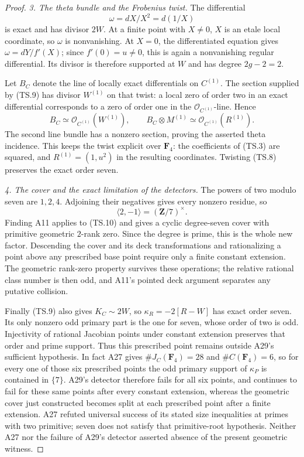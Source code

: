 \begin{proof}
\emph{3. The theta bundle and the Frobenius twist.}
The differential
\[
                    \omega=dX/X^2=d(1/X)
 \tag{TS.9}
\]
is exact and has divisor $2W$.  At a finite point with $X\ne0$,
$X$ is an etale local coordinate, so $\omega$ is nonvanishing.
At $X=0$, the differentiated equation gives
$\omega=dY/f'(X)$; since $f'(0)=u\ne0$, this is again a
nonvanishing regular differential.  Its divisor is therefore
supported at $W$ and has degree $2g-2=2$.

Let $B_C$ denote the line of locally exact differentials on
$C^{(1)}$.  The section supplied by (TS.9) has divisor
$W^{(1)}$ on that twist: a local zero of order two in an exact
differential corresponds to a zero of order one in the
$\mathcal O_{C^{(1)}}$-line.  Hence
\[
 B_C\simeq\mathcal O_{C^{(1)}}(W^{(1)}),\qquad
 B_C\otimes M^{(1)}
       \simeq\mathcal O_{C^{(1)}}(R^{(1)}).
 \tag{TS.10}
\]
The second line bundle has a nonzero section, proving the asserted
theta incidence.  This keeps the twist explicit over $\mathbf F_4$:
the coefficients of (TS.3) are squared, and
$R^{(1)}=(1,u^2)$ in the resulting coordinates.
Twisting (TS.8) preserves the exact order seven.

\emph{4. The cover and the exact limitation of the detectors.}
The powers of two modulo seven are $1,2,4$.  Adjoining their
negatives gives every nonzero residue, so
\[
                  \langle2,-1\rangle=(\mathbf Z/7)^\times.
 \tag{TS.11}
\]
Finding A11 applies to (TS.10) and gives a cyclic degree-seven
cover with primitive geometric $2$-rank zero.  Since the degree
is prime, this is the whole new factor.  Descending the cover and
its deck transformations and rationalizing a point above any
prescribed base point require only a finite constant extension.
The geometric rank-zero property survives these operations; the
relative rational class number is then odd, and A11's pointed
deck argument separates any putative collision.

Finally (TS.9) also gives $K_C\sim2W$, so
$\kappa_R=-2[R-W]$ has exact order seven.  Its only nonzero odd
primary part is the one for seven, whose order of two is odd.
Injectivity of rational Jacobian points under constant extension
preserves that order and prime support.  Thus this prescribed
point remains outside A29's sufficient hypothesis.  In fact A27
gives $\#J_C(\mathbf F_4)=28$ and $\#C(\mathbf F_4)=6$, so for
every one of those six prescribed points the odd primary support
of $\kappa_P$ is contained in $\{7\}$.  A29's detector therefore
fails for all six points, and continues to fail for these same
points after every constant extension, whereas the geometric
cover just constructed becomes split at each prescribed point
after a finite extension.  A27 refuted
universal success of its stated size inequalities at primes with
two primitive; seven does not satisfy that primitive-root
hypothesis.  Neither A27 nor the failure of A29's detector
asserted absence of the present geometric witness.
\end{proof}

